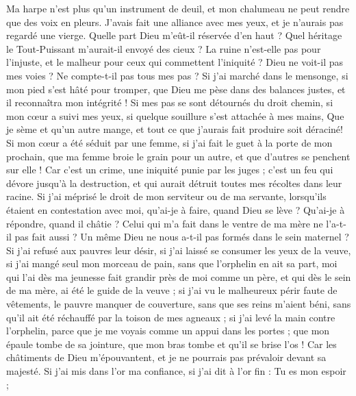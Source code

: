\begin{multicols}{2}
Ma harpe n'est plus qu'un instrument de deuil, et mon chalumeau ne peut rendre que des voix en pleurs.
\VerseOne{}J'avais fait une alliance avec mes yeux, et je n'aurais pas regardé une vierge.
Quelle part Dieu m'eût-il réservée d'en haut ? Quel héritage le Tout-Puissant m'aurait-il envoyé des cieux ?
La ruine n'est-elle pas pour l'injuste, et le malheur pour ceux qui commettent l'iniquité ?
Dieu ne voit-il pas mes voies ? Ne compte-t-il pas tous mes pas ?
Si j'ai marché dans le mensonge, si mon pied s'est hâté pour tromper,
que Dieu me pèse dans des balances justes, et il reconnaîtra mon intégrité !
Si mes pas se sont détournés du droit chemin, si mon cœur a suivi mes yeux, si quelque souillure s'est attachée à mes mains,
Que je sème et qu'un autre mange, et tout ce que j'aurais fait produire soit déraciné!
Si mon cœur a été séduit par une femme, si j'ai fait le guet à la porte de mon prochain,
que ma femme broie le grain pour un autre, et que d'autres se penchent sur elle !
Car c'est un crime, une iniquité punie par les juges ;
c'est un feu qui dévore jusqu'à la destruction, et qui aurait détruit toutes mes récoltes dans leur racine.
Si j'ai méprisé le droit de mon serviteur ou de ma servante, lorsqu'ils étaient en contestation avec moi,
qu'ai-je à faire, quand Dieu se lève ? Qu'ai-je à répondre, quand il châtie ?
Celui qui m'a fait dans le ventre de ma mère ne l'a-t-il pas fait aussi ? Un même Dieu ne nous a-t-il pas formés dans le sein maternel ?
Si j'ai refusé aux pauvres leur désir, si j'ai laissé se consumer les yeux de la veuve,
si j'ai mangé seul mon morceau de pain, sans que l'orphelin en ait sa part,
moi qui l'ai dès ma jeunesse fait grandir près de moi comme un père, et qui dès le sein de ma mère, ai été le guide de la veuve ;
si j'ai vu le malheureux périr faute de vêtements, le pauvre manquer de couverture,
sans que ses reins m'aient béni, sans qu'il ait été réchauffé par la toison de mes agneaux ;
si j'ai levé la main contre l'orphelin, parce que je me voyais comme un appui dans les portes ;
que mon épaule tombe de sa jointure, que mon bras tombe et qu'il se brise l'os !
Car les châtiments de Dieu m'épouvantent, et je ne pourrais pas prévaloir devant sa majesté.
Si j'ai mis dans l'or ma confiance, si j'ai dit à l'or fin : Tu es mon espoir ;

\end{multicols}
